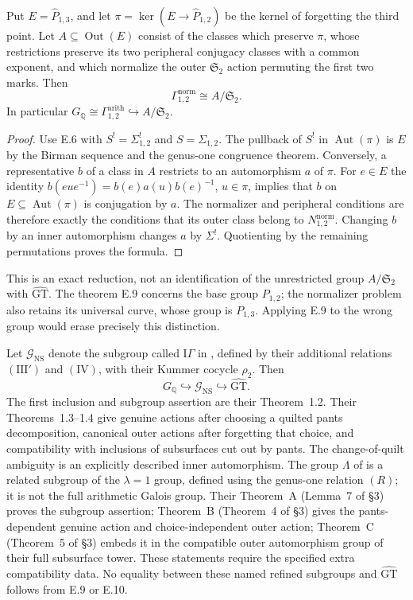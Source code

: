 Put $E=\widehat P_{1,3}$, and let
$\pi=\ker(E\to\widehat P_{1,2})$ be the kernel of forgetting the third
point.  Let $A\subseteq\operatorname{Out}(E)$ consist of the classes
which preserve $\pi$, whose restrictions preserve its two peripheral
conjugacy classes with a common exponent, and which normalize the
outer $\mathfrak S_2$ action permuting the first two marks.  Then
\[
 \Gamma^{\mathrm{norm}}_{1,2}\cong A/\mathfrak S_2.
\]
In particular
$G_{\mathbb Q}\cong\Gamma^{\mathrm{arith}}_{1,2}
\hookrightarrow A/\mathfrak S_2$.
\begin{proof}
Use E.6 with $S^!=\Sigma^!_{1,2}$ and $S=\Sigma_{1,2}$.
The pullback of $S^!$ in $\operatorname{Aut}(\pi)$ is $E$ by the
Birman sequence and the genus-one congruence theorem.  Conversely, a
representative $b$ of a class in $A$ restricts to an automorphism
$a$ of $\pi$.  For $e\in E$ the identity
$b(eue^{-1})=b(e)a(u)b(e)^{-1}$, $u\in\pi$, implies that
$b$ on $E\subseteq\operatorname{Aut}(\pi)$ is conjugation by $a$.
The normalizer and peripheral conditions are therefore exactly the
conditions that its outer class belong to $N^{\mathrm{norm}}_{1,2}$.
Changing $b$ by an inner automorphism changes $a$ by $\Sigma^!$.
Quotienting by the remaining permutations proves the formula.
\end{proof}

This is an exact reduction, not an identification of the unrestricted
group $A/\mathfrak S_2$ with $\widehat{\mathrm{GT}}$.
The theorem E.9 concerns the base group $P_{1,2}$; the normalizer problem
also retains its universal curve, whose group is $P_{1,3}$.
Applying E.9 to the wrong group would erase precisely this distinction.

Let $\mathcal G_{\mathrm{NS}}$ denote the subgroup called
$\mathrm I\!\Gamma$ in \citet[Definition~1.1]{NakamuraSchneps2000},
defined by their additional relations $(\mathrm{III}')$ and $(\mathrm{IV})$,
with their Kummer cocycle $\rho_2$.  Then
\[
 G_{\mathbb Q}\hookrightarrow\mathcal G_{\mathrm{NS}}
       \hookrightarrow\widehat{\mathrm{GT}}.
\]
The first inclusion and subgroup assertion are their Theorem~1.2.
Their Theorems~1.3--1.4 give genuine actions after choosing a quilted
pants decomposition, canonical outer actions after forgetting that
choice, and compatibility with inclusions of subsurfaces cut out by
pants.  The change-of-quilt ambiguity is an explicitly described inner
automorphism.  The group $\Lambda$ of
\citet{HatcherLochakSchneps2000} is a related subgroup of the
$\lambda=1$ group, defined using the genus-one relation $(R)$; it is not
the full arithmetic Galois group.  Their Theorem~A (Lemma~7 of \S3)
proves the subgroup assertion; Theorem~B (Theorem~4 of \S3) gives the
pants-dependent genuine action and choice-independent outer action;
Theorem~C (Theorem~5 of \S3) embeds it in the compatible outer
automorphism group of their full subsurface tower.  These statements require the specified
extra compatibility data.  No equality between these named refined
subgroups and $\widehat{\mathrm{GT}}$ follows from E.9 or E.10.

